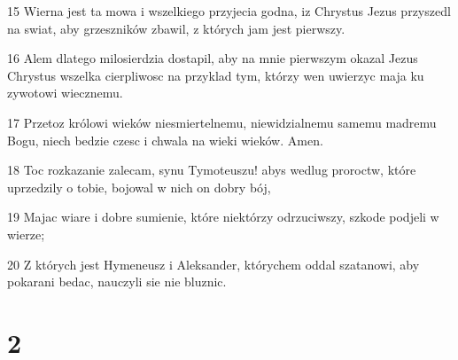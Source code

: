 \par 15 Wierna jest ta mowa i wszelkiego przyjecia godna, iz Chrystus Jezus przyszedl na swiat, aby grzeszników zbawil, z których jam jest pierwszy.
\par 16 Alem dlatego milosierdzia dostapil, aby na mnie pierwszym okazal Jezus Chrystus wszelka cierpliwosc na przyklad tym, którzy wen uwierzyc maja ku zywotowi wiecznemu.
\par 17 Przetoz królowi wieków niesmiertelnemu, niewidzialnemu samemu madremu Bogu, niech bedzie czesc i chwala na wieki wieków. Amen.
\par 18 Toc rozkazanie zalecam, synu Tymoteuszu! abys wedlug proroctw, które uprzedzily o tobie, bojowal w nich on dobry bój,
\par 19 Majac wiare i dobre sumienie, które niektórzy odrzuciwszy, szkode podjeli w wierze;
\par 20 Z których jest Hymeneusz i Aleksander, którychem oddal szatanowi, aby pokarani bedac, nauczyli sie nie bluznic.

\chapter{2}

